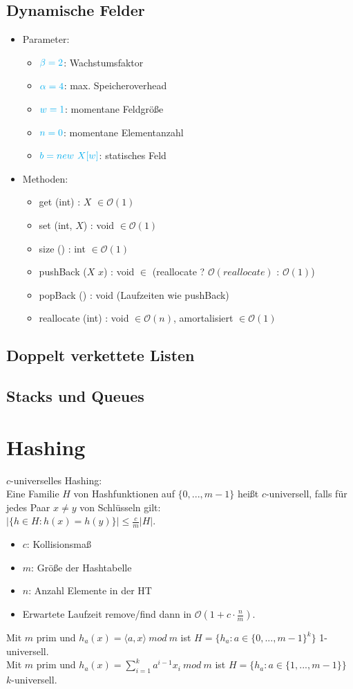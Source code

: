 \documentclass[12pt,a4paper]{article}
\begin{document}
\subsection{Dynamische Felder}
\begin{itemize}
\item Parameter:\begin{itemize}
\item $\color{cyan}\beta =2$: Wachstumsfaktor
\item $\color{cyan}\alpha =4$: max. Speicheroverhead
\item $\color{cyan}w=1$: momentane Feldgröße
\item $\color{cyan}n=0$: momentane Elementanzahl
\item $\color{cyan}b=new ~X[w]$: statisches Feld
\end{itemize}
\item Methoden:\begin{itemize}
\item get (int) : $X$ $\in\mathcal{O}(1)$
\item set (int, $X$) : void $\in\mathcal{O}(1)$
\item size () : int $\in\mathcal{O}(1)$
\item pushBack ($X$ $x$) : void $\in$ (reallocate ? $\mathcal{O}(reallocate)$ : $\mathcal{O}(1)$)
\item popBack () : void (Laufzeiten wie pushBack)
\item reallocate (int) : void $\in\mathcal{O}(n)$, amortalisiert $\in\mathcal{O}(1)$
\end{itemize}
\end{itemize}
\subsection{Doppelt verkettete Listen}

\subsection{Stacks und Queues}
\section{Hashing}
$c$-universelles Hashing:\\
Eine Familie $H$ von Hashfunktionen auf $\{0,...,m-1\}$ heißt $c$-universell, falls für jedes Paar $x\neq y$ von Schlüsseln gilt:\\
$\vert\{ h\in H: h(x)=h(y)\}\vert \leq \frac{c}{m}\vert H\vert$.\\
\begin{itemize}
\item $c$: Kollisionsmaß
\item $m$: Größe der Hashtabelle
\item $n$: Anzahl Elemente in der HT
\item Erwartete Laufzeit remove/find dann in $\mathcal{O}(1+c\cdot\frac{n}{m})$.
\end{itemize}
Mit $m$ prim und $h_a(x)=\langle a,x\rangle ~mod~m$ ist $H=\{h_a:a\in \{0,...,m-1\}^k\}$ 1-universell.\\
Mit $m$ prim und $h_a(x)=\sum_{i=1}^ka^{i-1}x_i ~mod~ m$ ist $H=\{h_a:a\in \{1,...,m-1\}\}$ $k$-universell.
\end{document}
